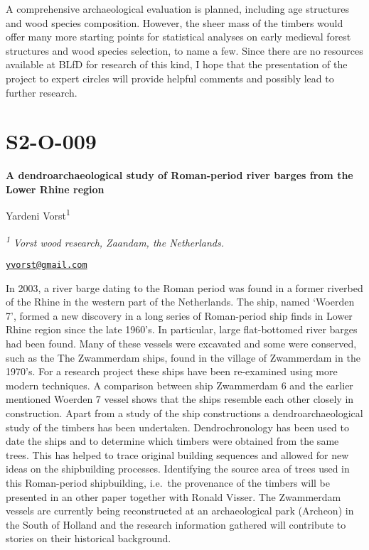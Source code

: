 \documentclass[
]{book}
\begin{document}
A comprehensive archaeological evaluation is planned, including age structures and wood species composition. However, the sheer mass of the timbers would offer many more starting points for statistical analyses on early medieval forest structures and wood species selection, to name a few. Since there are no resources available at BLfD for research of this kind, I hope that the presentation of the project to expert circles will provide helpful comments and possibly lead to further research.

\hypertarget{s2-o-009}{%
\section*{S2-O-009}\label{s2-o-009}}

\textbf{A dendroarchaeological study of Roman-period river barges from the Lower Rhine region}

Yardeni Vorst\textsuperscript{1}

\textsuperscript{\emph{1}} \emph{Vorst wood research, Zaandam, the Netherlands.}

\href{mailto:yvorst@gmail.com}{\nolinkurl{yvorst@gmail.com}}

In 2003, a river barge dating to the Roman period was found in a former riverbed of the Rhine in the western part of the Netherlands. The ship, named `Woerden 7', formed a new discovery in a long series of Roman-period ship finds in Lower Rhine region since the late 1960's. In particular, large flat-bottomed river barges had been found. Many of these vessels were excavated and some were conserved, such as the The Zwammerdam ships, found in the village of Zwammerdam in the 1970's. For a research project these ships have been re-examined using more modern techniques. A comparison between ship Zwammerdam 6 and the earlier mentioned Woerden 7 vessel shows that the ships resemble each other closely in construction. Apart from a study of the ship constructions a dendroarchaeological study of the timbers has been undertaken. Dendrochronology has been used to date the ships and to determine which timbers were obtained from the same trees. This has helped to trace original building sequences and allowed for new ideas on the shipbuilding processes. Identifying the source area of trees used in this Roman-period shipbuilding, i.e.~the provenance of the timbers will be presented in an other paper together with Ronald Visser. The Zwammerdam vessels are currently being reconstructed at an archaeological park (Archeon) in the South of Holland and the research information gathered will contribute to stories on their historical background.
\end{document}

